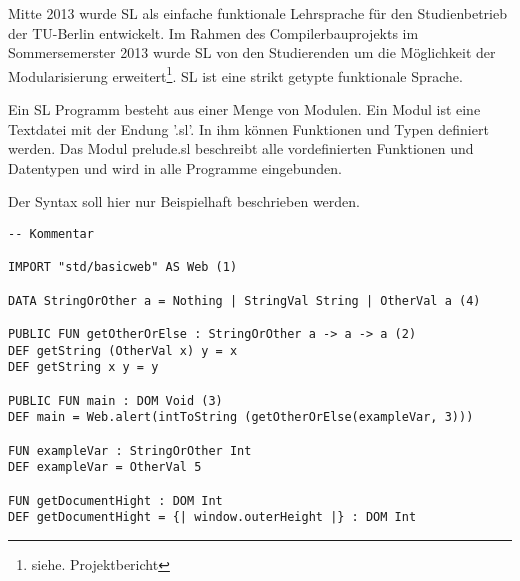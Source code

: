 \documentclass[12pt,a4paper]{report}
\begin{document}
Mitte 2013 wurde \ac{SL} als einfache funktionale Lehrsprache für den Studienbetrieb der TU-Berlin entwickelt. Im Rahmen des Compilerbauprojekts im Sommersemerster 2013 wurde \ac{SL} von den Studierenden um die Möglichkeit der Modularisierung erweitert\footnote{siehe. Projektbericht}. \ac{SL} ist eine strikt getypte funktionale Sprache.

Ein \ac{SL} Programm besteht aus einer Menge von Modulen. Ein Modul ist eine Textdatei mit der Endung '.sl'. In ihm können Funktionen und Typen definiert werden. Das Modul prelude.sl beschreibt alle vordefinierten Funktionen und Datentypen und wird in alle Programme eingebunden.

Der Syntax soll hier nur Beispielhaft beschrieben werden. 

\begin{lstlisting}[caption=Beispielmodul, label=lst:bsp1]
-- Kommentar

IMPORT "std/basicweb" AS Web (1)

DATA StringOrOther a = Nothing | StringVal String | OtherVal a (4)

PUBLIC FUN getOtherOrElse : StringOrOther a -> a -> a (2)
DEF getString (OtherVal x) y = x
DEF getString x y = y

PUBLIC FUN main : DOM Void (3)
DEF main = Web.alert(intToString (getOtherOrElse(exampleVar, 3)))

FUN exampleVar : StringOrOther Int
DEF exampleVar = OtherVal 5

FUN getDocumentHight : DOM Int
DEF getDocumentHight = {| window.outerHeight |} : DOM Int

\end{lstlisting}
\end{document}
